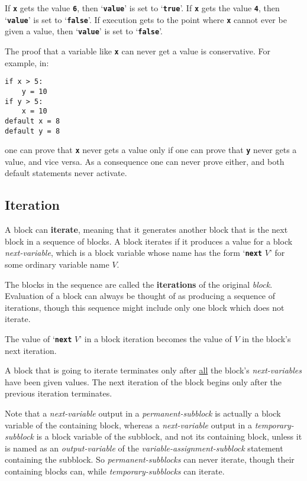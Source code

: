 \documentclass[12pt]{article}
\newcommand{\TT}[1]{{\tt \bfseries #1}}
\newcommand{\key}[1]{{\rm \bfseries #1}}
\newenvironment{indpar}[1][0.3in]%
	{\begin{list}{}%
		     {\setlength{\itemsep}{0in}%
		      \setlength{\topsep}{0in}%
		      \setlength{\parsep}{1ex}%
		      \setlength{\labelwidth}{#1}%
		      \setlength{\leftmargin}{#1}%
		      \addtolength{\leftmargin}{\labelsep}}%
	 \item}%
	{\end{list}}
\begin{document}
If \TT{x} gets the value \TT{6}, then `\TT{value}' is set to `\TT{true}'.
If \TT{x} gets the value \TT{4}, then `\TT{value}' is set to `\TT{false}'.
If execution gets to the point where \TT{x} cannot ever be given a
value, then `\TT{value}' is set to `\TT{false}'.

The proof that a variable like \TT{x} can never get a value is
conservative.  For example, in:
\begin{indpar}\begin{verbatim}
if x > 5:
    y = 10
if y > 5:
    x = 10
default x = 8
default y = 8
\end{verbatim}\end{indpar}

one can prove that \TT{x} never gets a value only if one can prove
that \TT{y} never gets a value, and vice versa.  As a consequence
one can never prove either, and both default statements never activate.

\subsection{Iteration}
\label{ITERATION}

A block can \key{iterate}, meaning that it generates another block
that is the next block in a sequence of blocks.  A block
iterates if it produces a value for a block {\em next-variable},
which is a block variable whose name has the form `\TT{next} $V$'
for some ordinary variable name $V$.

The blocks in the sequence are called the
\key{iterations} of the original {\em block}.
Evaluation of a block can always
be thought of as producing a sequence of iterations, though this
sequence might include only one block which does not iterate.

The value of `\TT{next} $V$' in a block iteration becomes the
value of $V$ in the block's next iteration.

A block that is going to iterate terminates only after
\underline{all} the block's {\em next-variables} have been given values.
The next iteration of the block
begins only after the previous iteration terminates.

Note that a {\em next-variable} output in a {\em permanent-subblock}
is actually a block variable of the containing block, whereas
a {\em next-variable} output in a {\em temporary-subblock} is
a block variable of the subblock, and not its containing
block, unless it is named as an
{\em output-variable} of the {\em variable-assignment-subblock}
statement containing the subblock.  So {\em permanent-subblocks}
can never iterate, though their containing blocks can,
while {\em temporary-subblocks} can iterate.
\end{document}
